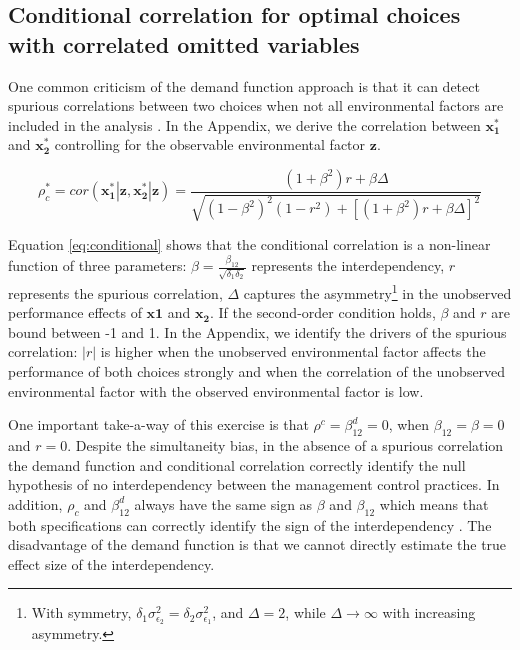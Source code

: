 \documentclass[12pt]{article}
\begin{document}
\subsection{Conditional correlation for optimal choices with correlated
omitted
variables}\label{conditional-correlation-for-optimal-choices-with-correlated-omitted-variables}

One common criticism of the demand function approach is that it can
detect spurious correlations between two choices when not all
environmental factors are included in the analysis \citep{Grabner2013}.
In the Appendix, we derive the correlation between \(\mathbf{x^*_1}\)
and \(\mathbf{x^*_2}\) controlling for the observable environmental
factor \(\mathbf{z}\).

\begin{equation} \label{eq:conditional}
\rho^*_c = cor(\mathbf{x_1^*|z, x_2^*|z}) =
\frac{
  (1 + \beta^2) r + \beta \Delta
}{
\sqrt{
  (1 - \beta^2)^2 (1 - r^2)
  + [(1 + \beta^2) r + \beta \Delta] ^ 2
}}
\end{equation}

Equation \eqref{eq:conditional} shows that the conditional correlation
is a non-linear function of three parameters:
\(\beta = \frac{\beta_{12}}{\sqrt{\delta_1\delta_2}}\) represents the
interdependency, \(r\) represents the spurious correlation, \(\Delta\)
captures the asymmetry\footnote{With symmetry,
  \(\delta_1 \sigma^2_{\epsilon_2} = \delta_2 \sigma^2_{\epsilon_1}\),
  and \(\Delta =2\), while \(\Delta \to \infty\) with increasing
  asymmetry.} in the unobserved performance effects of \(\mathbf{x1}\)
and \(\mathbf{x_2}\). If the second-order condition holds, \(\beta\) and
\(r\) are bound between -1 and 1. In the Appendix, we identify the
drivers of the spurious correlation: \(|r|\) is higher when the
unobserved environmental factor affects the performance of both choices
strongly and when the correlation of the unobserved environmental factor
with the observed environmental factor is low.

One important take-a-way of this exercise is that
\(\rho^c = \beta^d_{12} = 0\), when \(\beta_{12} = \beta = 0\) and
\(r = 0\). Despite the simultaneity bias, in the absence of a spurious
correlation the demand function and conditional correlation correctly
identify the null hypothesis of no interdependency between the
management control practices. In addition, \(\rho_c\) and
\(\beta^d_{12}\) always have the same sign as \(\beta\) and
\(\beta_{12}\) which means that both specifications can correctly
identify the sign of the interdependency \citep{Arora1996}. The
disadvantage of the demand function is that we cannot directly estimate
the true effect size of the interdependency.
\end{document}
